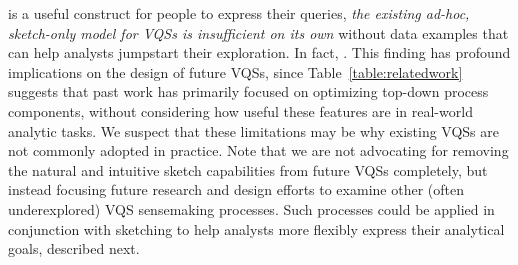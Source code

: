  is a useful construct for people to express their queries,
 \emph{the existing ad-hoc, sketch-only model for VQSs
 is insufficient on its own} without data examples
 that can help analysts jumpstart their exploration.
 In fact, . This finding has profound implications
 on the design of future VQSs, since Table~\ref{table:relatedwork}
 suggests that past work has primarily focused
 on optimizing top-down process components,
 without considering how useful these features
 are in real-world analytic tasks.
 We suspect that these limitations may be why existing VQSs are not commonly adopted in practice. Note that we are not advocating for removing the natural and intuitive sketch capabilities from future VQSs completely, but instead focusing future research and design efforts to examine other (often underexplored) VQS sensemaking processes. Such processes could be applied in conjunction with sketching to help analysts more flexibly express their analytical goals, described next.

 
